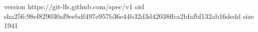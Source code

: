 version https://git-lfs.github.com/spec/v1
oid sha256:98ef829030af9eebdf497e957b36e44b32d3d42038ffca2bfafbf132ab16dedd
size 1941
